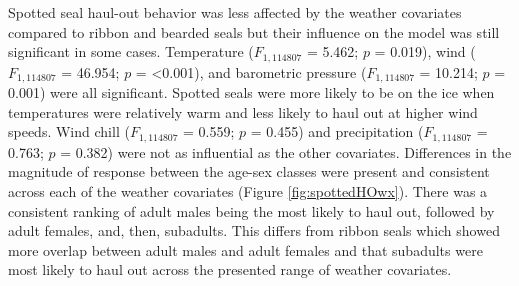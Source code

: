 \documentclass[fleqn,10pt,lineno]{wlpeerj} %
\begin{document}
Spotted seal haul-out behavior was less affected by the weather covariates
compared to ribbon and bearded seals but their influence on the model was still
significant in some cases.
Temperature
(\(F_{1,114807}\)
= 5.462; \(p\) = 0.019), wind
(\(F_{1,114807}\)
= 46.954; \(p\) = \textless0.001),
and barometric pressure
(\(F_{1,114807}\)
= 10.214; \(p\) =
0.001) were all significant. Spotted seals were more likely to be on the ice when
temperatures were relatively warm and less likely to
haul out at higher wind speeds. Wind chill
(\(F_{1,114807}\)
= 0.559; \(p\) =
0.455) and
precipitation
(\(F_{1,114807}\)
= 0.763; \(p\) =
0.382)
were not as influential as the other covariates.
Differences in the magnitude of response between the age-sex classes were
present and consistent across each of the weather covariates (Figure
\ref{fig:spottedHOwx}). There was a consistent ranking of adult males being the most
likely to haul out, followed by adult females, and, then, subadults. This differs
from ribbon seals which showed more overlap between adult males and adult females
and that subadults were most likely to haul out across the presented range of weather
covariates.
\end{document}
